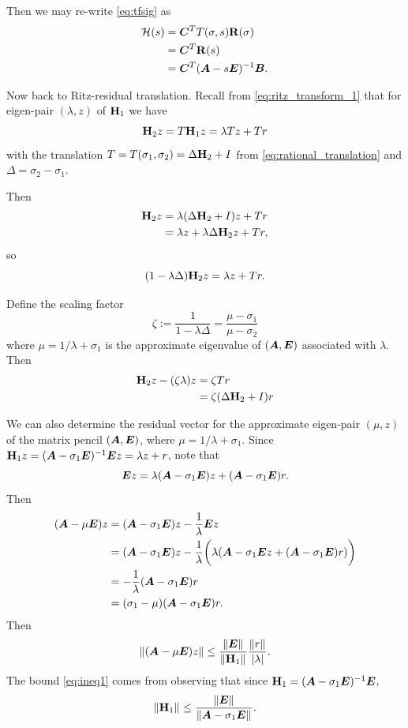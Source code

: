 Then we may re-write \eqref{eq:tfsig} as
\begin{align*}
\mathcal{H}(s) &= \bm{C}^T T(\sigma,s)\textbf{\textup{R}}(\sigma) \\
&= \bm{C}^T \textbf{\textup{R}}(s)\\
&= \bm{C}^T (\bm{A}- s \bm{E})^{-1} \bm{B}.
\end{align*}

Now back to Ritz-residual translation.   Recall from \eqref{eq:ritz_transform_1} that for eigen-pair $(\lambda,z)$ of $\textbf{\textup{H}}_1$ we have 
\[
\textbf{\textup{H}}_2 z = T \textbf{\textup{H}}_1 z  = \lambda T z +  T r
\]
 with the translation $T=T(\sigma_1,\sigma_2)=\Delta \textbf{\textup{H}}_2+I$  from \eqref{eq:rational_translation} and $\Delta = \sigma_2 - \sigma_1$.

Then 
\begin{align*}
\textbf{\textup{H}}_2 z &= \lambda (\Delta \textbf{\textup{H}}_2 + I)z + Tr\\
&= \lambda z + \lambda \Delta \textbf{\textup{H}}_2 z +T r, 
\label{eq:Rtiz_resid_translation}
\end{align*}
so
\begin{equation}
(1-\lambda \Delta)\textbf{\textup{H}}_2 z  = \lambda z + T r.
\end{equation}

Define the scaling factor 
\[
\zeta := \frac{1}{1-\lambda \Delta} =  \frac{\mu-\sigma_1}{\mu-\sigma_2}
\]
where $\mu=1/\lambda+\sigma_1$ is the approximate eigenvalue of $(\bm{A},\bm{E})$ associated with $\lambda$. 
Then 
\begin{align}
\textbf{\textup{H}}_2 z - (\zeta\lambda) z &=  \zeta T r \nonumber\\
&= \zeta (\Delta\textbf{\textup{H}}_2 + I) r
\label{eq:new_residual}
\end{align}

We can also determine the residual vector for the approximate eigen-pair $(\mu,z)$ of the matrix pencil $(\bm{A},\bm{E})$, where $\mu=1/\lambda+\sigma_1$.   Since
$\textbf{\textup{H}}_1 z = (\bm{A}-\sigma_1 \bm{E})^{-1}\bm{E} z = \lambda z + r$, note that 
\[
\bm{E} z = \lambda(\bm{A}-\sigma_1 \bm{E}) z +  (\bm{A}-\sigma_1 \bm{E}) r.
\]
Then
\begin{align*}
(\bm{A}-\mu \bm{E} )z &= (\bm{A}-\sigma_1 \bm{E})z - \frac{1}{\lambda}\bm{E} z \nonumber\\
&=  (\bm{A}-\sigma_1 \bm{E})z - \frac{1}{\lambda}\bigg( \lambda (\bm{A}-\sigma_1 \bm{E} z + (\bm{A}-\sigma_1 \bm{E})r) \bigg) \nonumber\\
&= -\frac{1}{\lambda}(\bm{A}-\sigma_1 \bm{E})r \nonumber\\
&= (\sigma_1 - \mu)(\bm{A}-\sigma_1 \bm{E})r.
\end{align*}
Then
\begin{equation}
\|(\bm{A}-\mu \bm{E} )z\| \leq \frac{\left\| \bm{E} \right\|_{}}{\left\| \textbf{\textup{H}}_1 \right\|_{}}  \frac{\left\| r \right\|_{}}{|\lambda|}.
\label{eq:ineq1}
\end{equation}  
The bound \eqref{eq:ineq1} comes from observing that since $\textbf{\textup{H}}_1=(\bm{A}-\sigma_1 \bm{E})^{-1}\bm{E}$, 
\[
\left\| \textbf{\textup{H}}_1 \right\|_{}\leq\frac{\left\| \bm{E} \right\|_{}}{\left\| \bm{A}-\sigma_1 \bm{E} \right\|_{}}.
\]


